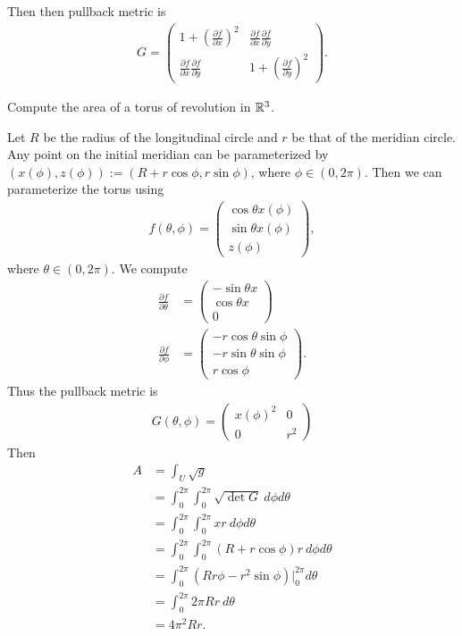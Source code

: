 \documentclass[12pt]{article}
\begin{document}
Then then pullback metric is
\begin{align*}
	G = \begin{pmatrix} 1+ \left( \frac{\partial f}{\partial x}  \right) ^2 & \frac{\partial f}{\partial x} \frac{\partial f}{\partial y} \\ \frac{\partial f}{\partial x} \frac{\partial f}{\partial y}&  1+ \left( \frac{\partial f}{\partial y}  \right) ^2   \end{pmatrix} .
\end{align*}
\begin{problem}[LN13 0.2]
Compute the area of a torus of revolution in $ \mathbb{R}^3$.
\end{problem}
Let $ R$ be the radius of the longitudinal circle and  $ r$ be that of the meridian circle. Any point on the initial meridian can be parameterized by $ (x(\phi),z(\phi)) := (R+r \cos \phi, r \sin\phi)$, where $ \phi \in (0,2\pi)$. Then we can parameterize the torus using 
\begin{align*}
	f(\theta,\phi) = \begin{pmatrix}  \cos \theta x(\phi)\\ \sin \theta x(\phi) \\z(\phi)  \end{pmatrix}  ,
\end{align*}
where $ \theta \in (0,2\pi)$. We compute
\begin{align*}
	\frac{\partial f}{\partial \theta} &= \begin{pmatrix} - \sin \theta x \\ \cos \theta x \\ 0 \end{pmatrix}  \\
	\frac{\partial f}{\partial \phi} &= \begin{pmatrix} -r\cos\theta \sin \phi \\ -r \sin\theta \sin\phi \\ r \cos\phi  \end{pmatrix}  .
\end{align*}
Thus the pullback metric is
\begin{align*}
	G(\theta,\phi) = \begin{pmatrix} x(\phi)^2 & 0\\0& r^2 \end{pmatrix} 
\end{align*}
Then
\begin{align*}
	A &= \int_U \sqrt{g} \\
	&= \int_{ 0}^{ 2\pi} \int_{ 0}^{ 2\pi} \sqrt{ \det G} \  d\phi d\theta    \\
	&= \int_{ 0}^{ 2\pi} \int_{ 0}^{ 2\pi} xr\  d\phi d\theta    \\
	&= \int_{ 0}^{ 2\pi} \int_{ 0}^{ 2\pi} (R+r\cos\phi)r\  d\phi d\theta    \\
	&= \int_{ 0}^{ 2\pi} (Rr \phi - r^2 \sin\phi)|_0^{2\pi} d\theta    \\
	&= \int_{ 0}^{ 2\pi} 2\pi Rr\ d\theta    \\
	&= 4\pi^2 Rr .
\end{align*}
\end{document}
